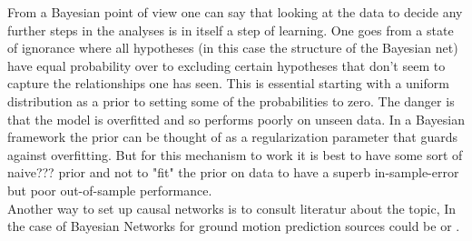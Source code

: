From a Bayesian point of view one can say that looking at the data to decide any further steps in the analyses is in itself a step of learning. One goes from a state of ignorance where all hypotheses (in this case the structure of the Bayesian net) have equal probability over to excluding certain hypotheses that don't seem to capture the relationships one has seen. This is essential starting with a uniform distribution as a prior to setting some of the probabilities to zero. The danger is that the model is overfitted and so performs poorly on unseen data. In a Bayesian framework the prior can be thought of as a regularization parameter that guards against overfitting. But for this mechanism to work it is best to have some sort of naive??? prior and not to "fit" the prior on data to have a superb in-sample-error but poor out-of-sample performance.\\
Another way to set up causal networks is to consult literatur about the topic, In the case of Bayesian Networks for ground motion prediction sources could be \cite{kuehn2010} or \cite{Vogel2014}.\\

